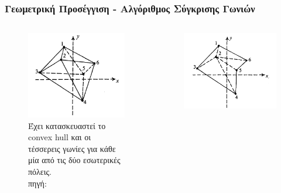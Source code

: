 \documentclass[xcolor=dvipsnames, 11pt]{beamer}
\newcommand{\el}{\selectlanguage{greek}}
\begin{document}
\begin{frame}
	\frametitle{\el Γεωμετρική Προσέγγιση - Αλγόριθμος Σύγκρισης Γωνιών}
	\begin{columns}
		\begin{column}{0.3\textwidth}
			\begin{figure}
				\includegraphics[scale=0.2]{images/geometric_approach_angle2.png}
				\caption{Έχει κατασκευαστεί το convex hull και οι τέσσερεις γωνίες για κάθε μία από τις δύο εσωτερικές πόλεις. \\ πηγή: \cite{16}}
			\end{figure} 
		\end{column}
		\begin{column}{0.3\textwidth}
			\begin{figure}
				\includegraphics[scale=0.2]{images/geometric_approach_angle3.png}

\end{figure}
\end{column}
\end{columns}
\end{frame}
\end{document}
